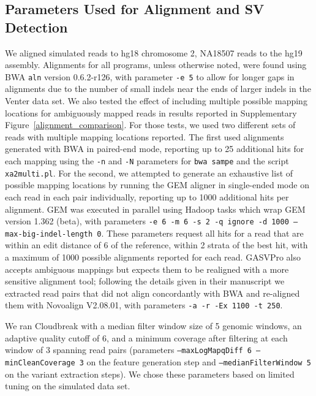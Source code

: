 \documentclass[11pt]{article}
\begin{document}
\subsection{Parameters Used for Alignment and SV Detection}

We aligned simulated reads to hg18 chromosome 2, NA18507 reads to the hg19 assembly. Alignments for all programs, unless otherwise noted, were found using BWA \texttt{aln} version 0.6.2-r126, with parameter \texttt{-e 5} to allow for longer gaps in alignments due to the number of small indels near the ends of larger indels in the Venter data set. We also tested the effect of including multiple possible mapping locations for ambiguously mapped reads in results reported in Supplementary Figure~\ref{alignment_comparison}. For those tests, we used two different sets of reads with multiple mapping locations reported. The first used alignments generated with BWA in paired-end mode, reporting up to 25 additional hits for each mapping  using the \texttt{-n} and \texttt{-N} parameters for \texttt{bwa sampe} and the script \texttt{xa2multi.pl}. For the second, we attempted to generate an exhaustive list of possible mapping locations by running the GEM aligner in single-ended mode on each read in each pair individually, reporting up to 1000 additional hits per alignment. GEM was executed in parallel using Hadoop tasks which wrap GEM version 1.362 (beta), with parameters \texttt{-e 6 -m 6 -s 2 -q ignore -d 1000 --max-big-indel-length 0}. These parameters request all hits for a read that are within an edit distance of 6 of the reference, within 2 strata of the best hit, with a maximum of 1000 possible alignments reported for each read. GASVPro also accepts ambiguous mappings but expects them to be realigned with a more sensitive alignment tool; following the details given in their manuscript we extracted read pairs that did not align concordantly with BWA and re-aligned them with Novoalign V2.08.01, with parameters \texttt{-a -r -Ex 1100 -t 250}. 

We ran Cloudbreak with a median filter window size of 5 genomic windows, an adaptive quality cutoff of 6, and a minimum coverage after filtering at each window of 3 spanning read pairs (parameters \texttt{--maxLogMapqDiff 6 --minCleanCoverage 3} on the feature generation step and \texttt{--medianFilterWindow 5} on the variant extraction steps). We chose these parameters based on limited tuning on the simulated data set.
\end{document}
